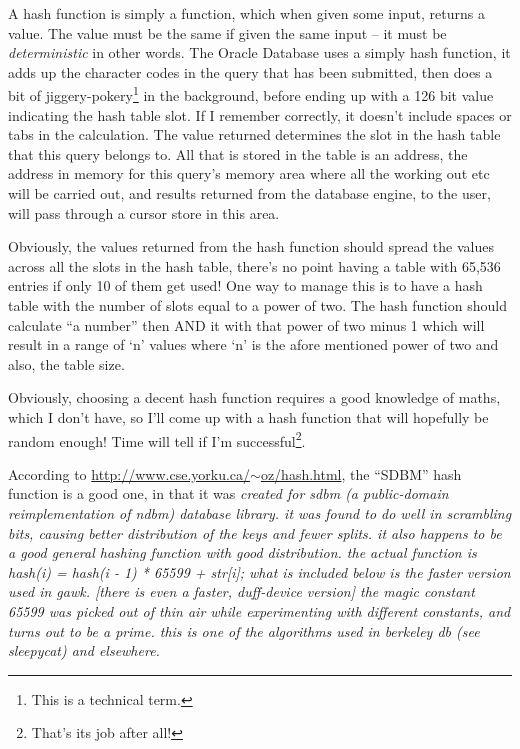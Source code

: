 A hash function is simply a function, which when given some input,
returns a value. The value must be the same if given the same input
-- it must be \emph{deterministic} in other words. The Oracle Database
uses a simply hash function, it adds up the character codes in the
query that has been submitted, then does a bit of jiggery-pokery\footnote{This is a technical term.}
in the background, before ending up with a 126 bit value indicating
the hash table slot. If I remember correctly, it doesn't include spaces
or tabs in the calculation. The value returned determines the slot
in the hash table that this query belongs to. All that is stored in
the table is an address, the address in memory for this query's memory
area where all the working out etc will be carried out, and results
returned from the database engine, to the user, will pass through
a cursor store in this area.

Obviously, the values returned from the hash function should spread
the values across all the slots in the hash table, there's no point
having a table with 65,536 entries if only 10 of them get used! One
way to manage this is to have a hash table with the number of slots
equal to a power of two. The hash function should calculate ``a number''
then AND it with that power of two minus 1 which will result in a
range of `n' values where `n' is the afore mentioned power of two
and also, the table size.

Obviously, choosing a decent hash function requires a good knowledge
of maths, which I don't have, so I'll come up with a hash function
that will hopefully be random enough! Time will tell if I'm successful\footnote{That's its job after all!}.

According to \href{http://www.cse.yorku.ca/~oz/hash.html}{http://www.cse.yorku.ca/$\sim$oz/hash.html},
the ``SDBM'' hash function is a good one, in that it was \emph{created
for sdbm (a public-domain reimplementation of ndbm) database library.
it was found to do well in scrambling bits, causing better distribution
of the keys and fewer splits. it also happens to be a good general
hashing function with good distribution. the actual function is hash(i)
= hash(i - 1) {*} 65599 + str{[}i{]}; what is included below is the
faster version used in gawk. {[}there is even a faster, duff-device
version{]} the magic constant 65599 was picked out of thin air while
experimenting with different constants, and turns out to be a prime.
this is one of the algorithms used in berkeley db (see sleepycat)
and elsewhere.}

